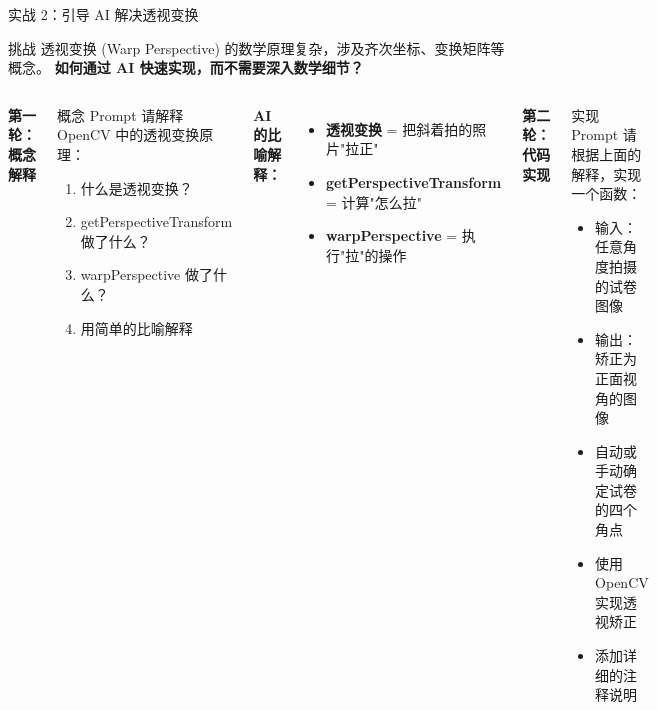 
\begin{frame}{实战 2：引导 AI 解决透视变换}
	\begin{block}{挑战}
		透视变换 (Warp Perspective) 的数学原理复杂，涉及齐次坐标、变换矩阵等概念。
		\textbf{如何通过 AI 快速实现，而不需要深入数学细节？}
	\end{block}

	\vspace{0.3cm}

	\begin{columns}
		\textbf{第一轮：概念解释}

		\begin{exampleblock}{概念 Prompt}
			\small
			请解释 OpenCV 中的透视变换原理：
			\begin{enumerate}
				\item 什么是透视变换？
				\item getPerspectiveTransform 做了什么？
				\item warpPerspective 做了什么？
				\item 用简单的比喻解释
			\end{enumerate}
		\end{exampleblock}

		\vspace{0.2cm}

		\textbf{AI 的比喻解释：}

		\begin{itemize}
			\item \textbf{透视变换} = 把斜着拍的照片"拉正"
			\item \textbf{getPerspectiveTransform} = 计算"怎么拉"
			\item \textbf{warpPerspective} = 执行"拉"的操作
		\end{itemize}

		\textbf{第二轮：代码实现}

		\begin{exampleblock}{实现 Prompt}
			\small
			请根据上面的解释，实现一个函数：
			\begin{itemize}
				\item 输入：任意角度拍摄的试卷图像
				\item 输出：矫正为正面视角的图像
				\item 自动或手动确定试卷的四个角点
				\item 使用 OpenCV 实现透视矫正
				\item 添加详细的注释说明
			\end{itemize}
		\end{exampleblock}


\end{columns}
\end{frame}
